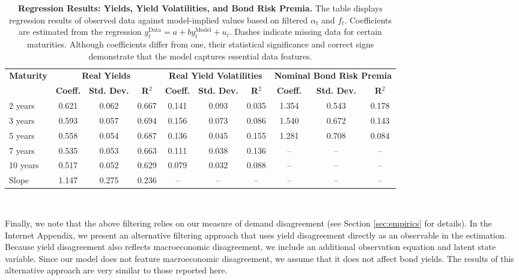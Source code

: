 \documentclass[preprint,11pt,authoryear]{elsarticle}
\theoremstyle{plain}
\begin{document}
\begin{table}[ht]
    \centering
    \begin{tabular}{lccccccccc}
        \toprule
        \multirow{2}{*}{\textbf{Maturity}} & \multicolumn{3}{c}{\textbf{Real Yields}} & \multicolumn{3}{c}{\textbf{Real Yield Volatilities}} & \multicolumn{3}{c}{\textbf{Nominal Bond Risk Premia}} \\
        \cmidrule(lr){2-4} \cmidrule(lr){5-7} \cmidrule(lr){8-10}
        & \textbf{Coeff.} & \textbf{Std. Dev.} & \textbf{R$^2$} & \textbf{Coeff.} & \textbf{Std. Dev.} & \textbf{R$^2$} & \textbf{Coeff.} & \textbf{Std. Dev.} & \textbf{R$^2$} \\
        \midrule
        2 years  & 0.621 & 0.062 & 0.667 & 0.141 & 0.093 & 0.035 & 1.354 & 0.543 & 0.178 \\
        3 years  & 0.593 & 0.057 & 0.694 & 0.156 & 0.073 & 0.086 & 1.540 & 0.672 & 0.143 \\
        5 years  & 0.558 & 0.054 & 0.687 & 0.136 & 0.045 & 0.155 & 1.281 & 0.708 & 0.084 \\
        7 years  & 0.535 & 0.053 & 0.663 & 0.111 & 0.038 & 0.136 & --    & --    & --    \\
        10 years & 0.517 & 0.052 & 0.629 & 0.079 & 0.032 & 0.088 & --    & --    & --    \\
        Slope    & 1.147 & 0.275 & 0.236 & --    & --    & --    & --    & --    & --    \\ 
        \bottomrule
    \end{tabular} \\ \vspace{0.2cm}
    \caption{\textbf{Regression Results: Yields, Yield Volatilities, and Bond Risk Premia.} The table displays regression results of observed data against model-implied values based on filtered $\alpha_t$ and $f_t$. Coefficients are estimated from the regression $y^{\text{Data}}_t = a + b y^{\text{Model}}_t + u_t$. Dashes indicate missing data for certain maturities. Although coefficients differ from one, their statistical significance and correct signs demonstrate that the model captures essential data features.} \label{table:UKFOOS}
\end{table}

 



Finally, we note that the above filtering relies on our measure of demand disagreement (see Section \ref{sec:empirics} for details). In the Internet Appendix, we present an alternative filtering approach that uses yield disagreement directly as an observable in the estimation. Because yield disagreement also reflects macroeconomic disagreement, we include an additional observation equation and latent state variable. Since our model does not feature macroeconomic disagreement, we assume that it does not affect bond yields. The results of this alternative approach are very similar to those reported here.
\end{document}
